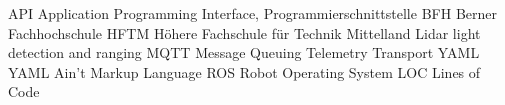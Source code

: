    {API}   {Application Programming Interface, Programmierschnittstelle}
   {BFH}   {Berner Fachhochschule}
  {HFTM}  {Höhere Fachschule für Technik Mittelland}
 {Lidar} {light detection and ranging}
  {MQTT}  {Message Queuing Telemetry Transport}
  {YAML}  {YAML Ain’t Markup Language}
   {ROS}   {Robot Operating System}
   {LOC}   {Lines of Code}
